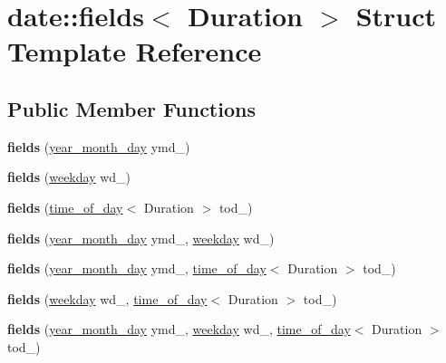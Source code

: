 \hypertarget{structdate_1_1fields}{}\section{date\+::fields$<$ Duration $>$ Struct Template Reference}
\label{structdate_1_1fields}
\subsection*{Public Member Functions}
\begin{DoxyCompactItemize}
\item 
\mbox{\label{structdate_1_1fields_a9d75f9e549f500bc8fd3371c20ac896f}} 
{\bfseries fields} (\mbox{\hyperlink{classdate_1_1year__month__day}{year\+\_\+month\+\_\+day}} ymd\+\_\+)
\item 
\mbox{\label{structdate_1_1fields_a8ca57b99980985e7819692194ed7e020}} 
{\bfseries fields} (\mbox{\hyperlink{classdate_1_1weekday}{weekday}} wd\+\_\+)
\item 
\mbox{\label{structdate_1_1fields_aab53862f58eb84033e69d113f98dbcf6}} 
{\bfseries fields} (\mbox{\hyperlink{classdate_1_1time__of__day}{time\+\_\+of\+\_\+day}}$<$ Duration $>$ tod\+\_\+)
\item 
\mbox{\label{structdate_1_1fields_a239955edb244d9bd999200831b2906b9}} 
{\bfseries fields} (\mbox{\hyperlink{classdate_1_1year__month__day}{year\+\_\+month\+\_\+day}} ymd\+\_\+, \mbox{\hyperlink{classdate_1_1weekday}{weekday}} wd\+\_\+)
\item 
\mbox{\label{structdate_1_1fields_a4541f9a38465bb9b6e49863dc230be1c}} 
{\bfseries fields} (\mbox{\hyperlink{classdate_1_1year__month__day}{year\+\_\+month\+\_\+day}} ymd\+\_\+, \mbox{\hyperlink{classdate_1_1time__of__day}{time\+\_\+of\+\_\+day}}$<$ Duration $>$ tod\+\_\+)
\item 
\mbox{\label{structdate_1_1fields_a575380e108b69c35916c58d5154c149b}} 
{\bfseries fields} (\mbox{\hyperlink{classdate_1_1weekday}{weekday}} wd\+\_\+, \mbox{\hyperlink{classdate_1_1time__of__day}{time\+\_\+of\+\_\+day}}$<$ Duration $>$ tod\+\_\+)
\item 
\mbox{\label{structdate_1_1fields_ace6d28ef4491f7592b68df1d38cb1854}} 
{\bfseries fields} (\mbox{\hyperlink{classdate_1_1year__month__day}{year\+\_\+month\+\_\+day}} ymd\+\_\+, \mbox{\hyperlink{classdate_1_1weekday}{weekday}} wd\+\_\+, \mbox{\hyperlink{classdate_1_1time__of__day}{time\+\_\+of\+\_\+day}}$<$ Duration $>$ tod\+\_\+)
\end{DoxyCompactItemize}
